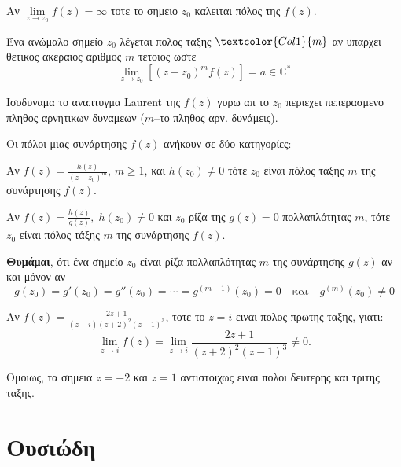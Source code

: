 \begin{dfn} 
  Αν $\lim\limits_{z\to z_0}f(z)=\infty$ τοτε το σημειο $z_0$ καλειται 
  \textcolor{Col1}{πόλος} της $f(z)$. 
\end{dfn}

\begin{dfn}
  Ένα ανώμαλο σημείο $z_0$ λέγεται \textcolor{Col1}{πολος ταξης} 
  $\textcolor{Col1}{m}$ αν υπαρχει θετικος ακεραιος αριθμος $m$ τετοιος ωστε 
  \[
    \lim\limits_{z\to z_0}\left[(z-z_0)^mf(z)\right]=a \in \mathbb{C}^{*}
  \]
  \begin{myitemize}
    \item Ισοδυναμα το αναπτυγμα Laurent της $f(z)$ \textcolor{Col2}{γυρω απ το $z_0$} 
      περιεχει πεπερασμενο πληθος αρνητικων δυναμεων ($m$--το πληθος αρν. δυνάμεις). 
  \end{myitemize}
\end{dfn}

\begin{rem}
  Οι πόλοι μιας συνάρτησης $ f(z) $ ανήκουν σε δύο κατηγορίες:
  \begin{myitemize}
    \item Αν $ f(z) = \frac{h(z)}{(z-z_{0})^{m}}$, $m \geq 1 $, και $ h(z_{0}) \neq 0 $ 
      τότε $ z_{0} $ είναι πόλος τάξης $ m $ της συνάρτησης $f(z)$.
    \item Αν $ f(z) = \frac{h(z)}{g(z)}, \; h(z_{0}) \neq 0 $ και $ z_{0} $ ρίζα της 
      $ g(z) = 0 $ πολλαπλότητας $ m $, τότε $ z_{0} $ είναι πόλος τάξης $ m
      $ της συνάρτησης $f(z)$.
  \end{myitemize}
\end{rem}

\begin{rem}
  \textbf{Θυμάμαι}, ότι ένα σημείο $ z_{0} $ είναι ρίζα \textcolor{Col1}{πολλαπλότητας 
  $ m $} της συνάρτησης $ g(z) $ αν και μόνον αν 
  \[
    g(z_{0}) = g'(z_{0}) = g''(z_{0}) = \cdots = g^{(m-1)}(z_{0}) = 0 \quad \text{και} 
    \quad g^{(m)}(z_{0}) \neq 0 
  \] 
\end{rem}

\begin{example}
  Αν $f(z)=\frac{2z+1}{(z-i)(z+2)^2(z-1)^3}$, τοτε το $z=i$ ειναι πολος πρωτης ταξης, 
  γιατι: 
  \[
    \lim\limits_{z\to i}f(z)=\lim\limits_{z\to i}\frac{2z+1}{(z+2)^2(z-1)^3}\neq 0.
  \]

  Ομοιως, τα σημεια $z=-2$ και $z=1$ αντιστοιχως ειναι πολοι δευτερης και τριτης ταξης.
\end{example}

\section*{Ουσιώδη}

